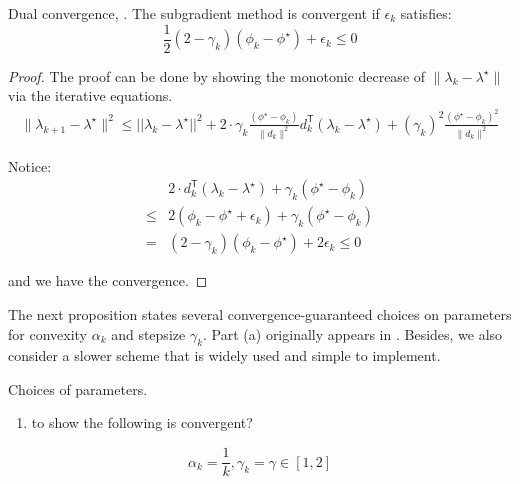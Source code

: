\begin{lemma} \label{lemma:dual_conv} Dual convergence, \cite{brannlund1995generalized}. The
  subgradient method is convergent if \(\epsilon_k\) satisfies:
  \begin{equation}
    \frac{1}{2}(2 - \gamma_k) (\phi_{k} - \phi^\star)  + \epsilon_k \le 0
  \end{equation}
\end{lemma}
\begin{proof}
  The proof can be done by showing the monotonic decrease of
  \(\|\lambda_{k} - \lambda^\star\|\) via the iterative equations.
  \begin{equation}\begin{aligned}
      \|\lambda_{k+1} - \lambda^\star\|^2 \le ||\lambda_k - \lambda^\star||^2
      + 2\cdot \gamma_k \frac{(\phi^\star - \phi_{k})}{\|d_{k}\|^{2}} d_k^\mathsf{T}(\lambda_k - \lambda^\star)
      + (\gamma_{k})^{2} \frac{(\phi^\star - \phi_{k})^{2}}{\|d_{k}\|^{2}}
    \end{aligned}\end{equation}

  Notice: \begin{equation}\begin{aligned}
          & 2  \cdot d_k^\mathsf{T}(\lambda_k - \lambda^\star) + \gamma_{k}(\phi^\star - \phi_{k}) \\
      \le & 2 (\phi_{k} - \phi^\star + \epsilon_k) + \gamma_k(\phi^\star -\phi_k)                  \\
      =   & (2 - \gamma_k) (\phi_{k} - \phi^\star)  + 2\epsilon_k \le 0
    \end{aligned}\end{equation}

  and we have the convergence.
\end{proof}

The next proposition states several convergence-guaranteed choices on
parameters for convexity \(\alpha_k\) and stepsize \(\gamma_k\). Part
(a) originally appears in \cite{brannlund1995generalized}. Besides, we
also consider a slower scheme that is widely used and simple to
implement.

\begin{corollary} Choices of parameters.

  \begin{enumerate}
    \def\labelenumi{(\alph{enumi})}
    \setcounter{enumi}{1}
    \tightlist
    \item
          to show the following is convergent?
  \end{enumerate}

  \[\alpha_k = \frac{1}{k}, \gamma_k = \gamma \in [1, 2]\]


\end{corollary}

